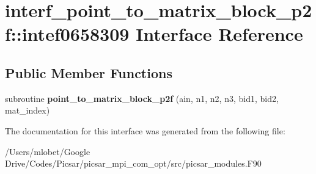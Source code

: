 \hypertarget{interfaceinterf__point__to__matrix__block__p2f_1_1intef0658309}{}\section{interf\+\_\+point\+\_\+to\+\_\+matrix\+\_\+block\+\_\+p2f\+:\+:intef0658309 Interface Reference}
\label{interfaceinterf__point__to__matrix__block__p2f_1_1intef0658309}
\subsection*{Public Member Functions}
\begin{DoxyCompactItemize}
\item 
subroutine {\bfseries point\+\_\+to\+\_\+matrix\+\_\+block\+\_\+p2f} (ain, n1, n2, n3, bid1, bid2, mat\+\_\+index)\hypertarget{interfaceinterf__point__to__matrix__block__p2f_1_1intef0658309_aa3cc0551a868a1165854aed4d4771a86}{}\label{interfaceinterf__point__to__matrix__block__p2f_1_1intef0658309_aa3cc0551a868a1165854aed4d4771a86}

\end{DoxyCompactItemize}


The documentation for this interface was generated from the following file\+:\begin{DoxyCompactItemize}
\item 
/\+Users/mlobet/\+Google Drive/\+Codes/\+Picsar/picsar\+\_\+mpi\+\_\+com\+\_\+opt/src/picsar\+\_\+modules.\+F90\end{DoxyCompactItemize}
